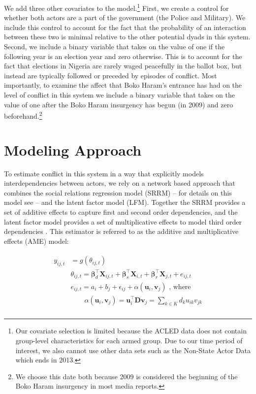 We add three other covariates to the model.\footnote{Our covariate selection is limited because the ACLED data does not contain group-level characteristics for each armed group. Due to our time period of interest, we also cannot use other data sets such as the Non-State Actor Data \citep{cunningham:etal:2009} which ends in 2013.} First, we create a control for whether both actors are a part of the government (the Police and Military). We include this control to account for the fact that the probability of an interaction between these two is minimal relative to the other potential dyads in this system. Second, we include a binary variable that takes on the value of one if the following year is an election year and zero otherwise. This is to account for the fact that elections in Nigeria are rarely waged peacefully in the ballot box, but instead are typically followed or preceded by episodes of conflict. Most importantly, to examine the affect that Boko Haram's entrance has had on the level of conflict in this system we include a binary variable that takes on the value of one after the Boko Haram insurgency has begun (in 2009) and zero beforehand.\footnote{We choose this date both because 2009 is considered the beginning of the Boko Haram insurgency in most media reports.}

\section*{Modeling Approach}

To estimate conflict in this system in a way that explicitly models interdependencies between actors, we rely on a network based approach that combines the social relations regression model (SRRM) -- for details on this model see \citet{dorff:minhas:2017} -- and the latent factor model (LFM). Together the SRRM provides a set of additive effects to capture first and second order dependencies, and the latent factor model provides a set of multiplicative effects to model third order dependencies \citep{minhas:etal:2016:arxiv}. This estimator is referred to as the additive and multiplicative effects (AME) model:

\vspace{-10mm}
\begin{align}
	\begin{aligned}
		y_{ij,t} &= g(\theta_{ij,t}) \\ 
		&\theta_{ij,t} = \bm\beta_{d}^{\top} \mathbf{X}_{ij,t} + \bm\beta_{s}^{\top} \mathbf{X}_{i,t} + \bm\beta_{r}^{\top} \mathbf{X}_{j,t} + e_{ij,t} \\
		&e_{ij,t} = a_{i} + b_{j}  + \epsilon_{ij} + \alpha(\textbf{u}_{i}, \textbf{v}_{j}) \text{  , where } \\
		&\qquad \alpha(\textbf{u}_{i}, \textbf{v}_{j}) = \textbf{u}_{i}^{\top} \textbf{D} \textbf{v}_{j} = \sum_{k \in K} d_{k} u_{ik} v_{jk} \\ 
	\label{eqn:ame}
	\end{aligned}
\end{align}

